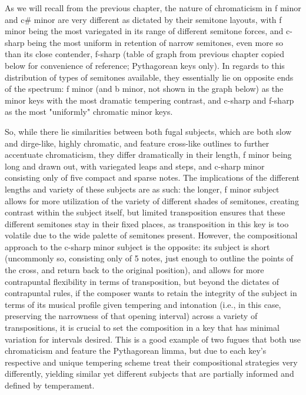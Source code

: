 As we will recall from the previous chapter, the nature of chromaticism
in f minor and c\# minor are very different as dictated by their
semitone layouts, with f minor being the most variegated in its range of
different semitone forces, and c-sharp being the most uniform in
retention of narrow semitones, even more so than its close contender,
f-sharp (table of graph from previous chapter copied below for
convenience of reference; Pythagorean keys only). In regards to this
distribution of types of semitones available, they essentially lie on
opposite ends of the spectrum: f minor (and b minor, not shown in the
graph below) as the minor keys with the most dramatic tempering
contrast, and c-sharp and f-sharp as the most "uniformly" chromatic
minor keys.


    \begin{center}
    \end{center}
    
    So, while there lie similarities between both fugal subjects, which are
both slow and dirge-like, highly chromatic, and feature cross-like
outlines to further accentuate chromaticism, they differ dramatically in
their length, f minor being long and drawn out, with variegated leaps
and steps, and c-sharp minor consisting only of five compact and sparse
notes. The implications of the different lengths and variety of these
subjects are as such: the longer, f minor subject allows for more
utilization of the variety of different shades of semitones, creating
contrast within the subject itself, but limited transposition ensures
that these different semitones stay in their fixed places, as
transposition in this key is too volatile due to the wide palette of
semitones present. However, the compositional approach to the c-sharp
minor subject is the opposite: its subject is short (uncommonly so,
consisting only of 5 notes, just enough to outline the points of the
cross, and return back to the original position), and allows for more
contrapuntal flexibility in terms of transposition, but beyond the
dictates of contrapuntal rules, if the composer wants to retain the
integrity of the subject in terms of its musical profile given tempering
and intonation (i.e., in this case, preserving the narrowness of that
opening interval) across a variety of transpositions, it is crucial to
set the composition in a key that has minimal variation for intervals
desired. This is a good example of two fugues that both use chromaticism
and feature the Pythagorean limma, but due to each key's respective and
unique tempering scheme treat their compositional strategies very
differently, yielding similar yet different subjects that are partially
informed and defined by temperament.

